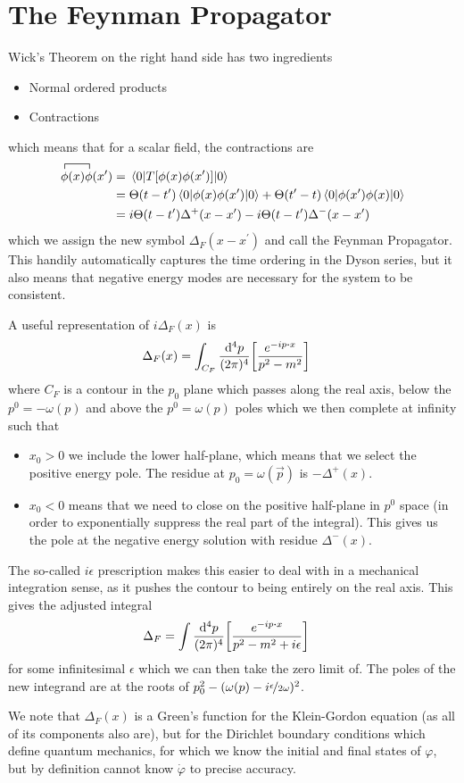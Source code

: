 \documentclass[notes.tex]{subfiles}
\begin{document}
\section{The Feynman Propagator}\label{sec:rqft_interactions_feynman-prop}
Wick's Theorem on the right hand side has two ingredients
\begin{itemize}
	\item Normal ordered products
	\item Contractions
\end{itemize}
which means that for a scalar field, the contractions are
\begin{align*}
	\contraction{}{\phi}{(x)}{\phi}\phi(x)\phi(x^\prime) &= \mel{0}{T\qty[\phi(x)\phi(x^\prime)]}{0}\\
	&= \Theta(t-t^\prime)\expval{\phi(x)\phi(x^\prime)}{0} + \Theta(t^\prime-t)\expval{\phi(x^\prime)\phi(x)}{0}\\
	&= i\Theta(t-t^\prime)\Delta^+(x-x^\prime) - i\Theta(t-t^\prime)\Delta^-(x-x^\prime)
\end{align*}
which we assign the new symbol $\Delta_F(x-x^\prime)$ and call the Feynman Propagator.
This handily automatically captures the time ordering in the Dyson series, but it also means that negative energy modes are necessary for the system to be consistent.

A useful representation of $i\Delta_F(x)$ is 
\begin{align*}
	\Delta_F(x) &= \int_{C_F} \frac{\dd[4]{p}}{(2\pi)^4}\qty[\frac{e^{-ip\vdot{x}}}{p^2 - m^2}]
\end{align*}
where $C_F$ is a contour in the $p_0$ plane which passes along the real axis, below the $p^0 = -\omega(p)$ and above the $p^0=\omega(p)$ poles which we then complete at infinity such that 
\begin{itemize}
	\item $x_0>0$ we include the lower half-plane, which means that we select the positive energy pole.
	The residue at $p_0 = \omega(\vec{p})$ is $-\Delta^+(x)$.
	\item $x_0 < 0$ means that we need to close on the positive half-plane in $p^0$ space (in order to exponentially suppress the real part of the integral). This gives us the pole at the negative energy solution with residue $\Delta^-(x)$.
\end{itemize}

The so-called $i\epsilon$ prescription makes this easier to deal with in a mechanical integration sense, as it pushes the contour to being entirely on the real axis.
This gives the adjusted integral
\begin{align*}
	\Delta_F &= \int\frac{\dd[4]{p}}{(2\pi)^4} \qty[\frac{e^{-ip\vdot{x}}}{p^2 - m^2 + i\epsilon}]
\end{align*}
for some infinitesimal $\epsilon$ which we can then take the zero limit of. 
The poles of the new integrand are at the roots of $p_0^2 - (\omega(p) - i\nicefrac{\epsilon}{2\omega})^2$.

We note that $\Delta_F(x)$ is a Green's function for the Klein-Gordon equation (as all of its components also are), but for the Dirichlet boundary conditions which define quantum mechanics, for which we know the initial and final states of $\varphi$, but by definition cannot know $\dot\varphi$ to precise accuracy.
\end{document}
